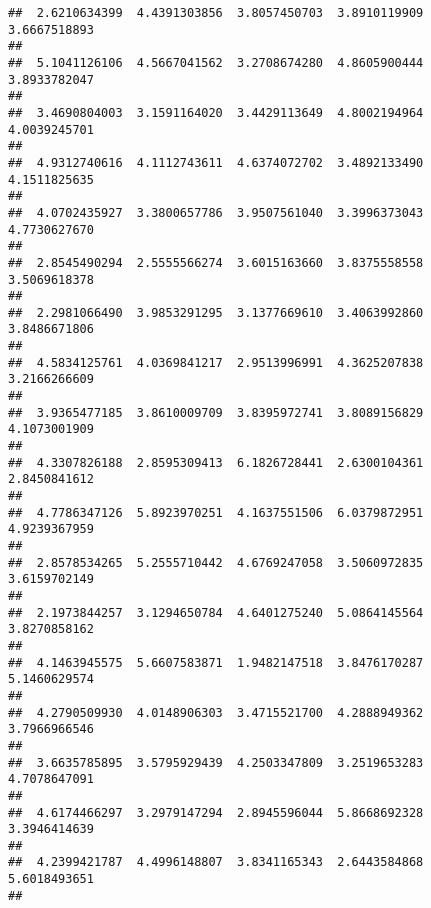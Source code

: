 \documentclass[]{article}
\begin{document}
\begin{verbatim}
##  2.6210634399  4.4391303856  3.8057450703  3.8910119909  3.6667518893 
##                                                                       
##  5.1041126106  4.5667041562  3.2708674280  4.8605900444  3.8933782047 
##                                                                       
##  3.4690804003  3.1591164020  3.4429113649  4.8002194964  4.0039245701 
##                                                                       
##  4.9312740616  4.1112743611  4.6374072702  3.4892133490  4.1511825635 
##                                                                       
##  4.0702435927  3.3800657786  3.9507561040  3.3996373043  4.7730627670 
##                                                                       
##  2.8545490294  2.5555566274  3.6015163660  3.8375558558  3.5069618378 
##                                                                       
##  2.2981066490  3.9853291295  3.1377669610  3.4063992860  3.8486671806 
##                                                                       
##  4.5834125761  4.0369841217  2.9513996991  4.3625207838  3.2166266609 
##                                                                       
##  3.9365477185  3.8610009709  3.8395972741  3.8089156829  4.1073001909 
##                                                                       
##  4.3307826188  2.8595309413  6.1826728441  2.6300104361  2.8450841612 
##                                                                       
##  4.7786347126  5.8923970251  4.1637551506  6.0379872951  4.9239367959 
##                                                                       
##  2.8578534265  5.2555710442  4.6769247058  3.5060972835  3.6159702149 
##                                                                       
##  2.1973844257  3.1294650784  4.6401275240  5.0864145564  3.8270858162 
##                                                                       
##  4.1463945575  5.6607583871  1.9482147518  3.8476170287  5.1460629574 
##                                                                       
##  4.2790509930  4.0148906303  3.4715521700  4.2888949362  3.7966966546 
##                                                                       
##  3.6635785895  3.5795929439  4.2503347809  3.2519653283  4.7078647091 
##                                                                       
##  4.6174466297  3.2979147294  2.8945596044  5.8668692328  3.3946414639 
##                                                                       
##  4.2399421787  4.4996148807  3.8341165343  2.6443584868  5.6018493651 
##                                                                       

\end{verbatim}
\end{document}
